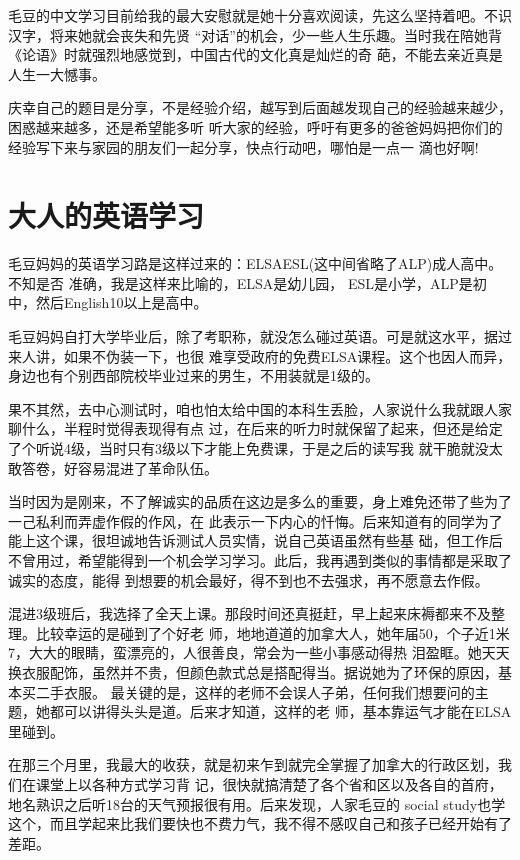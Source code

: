 \documentclass[11pt,a4paper,onecolumn]{article}
\begin{document}
毛豆的中文学习目前给我的最大安慰就是她十分喜欢阅读，先这么坚持着吧。不识汉字，将来她就会丧失和先贤
``对话''的机会，少一些人生乐趣。当时我在陪她背《论语》时就强烈地感觉到，中国古代的文化真是灿烂的奇
葩，不能去亲近真是人生一大憾事。


庆幸自己的题目是分享，不是经验介绍，越写到后面越发现自己的经验越来越少，困惑越来越多，还是希望能多听
听大家的经验，呼吁有更多的爸爸妈妈把你们的经验写下来与家园的朋友们一起分享，快点行动吧，哪怕是一点一
滴也好啊!

\section{大人的英语学习}

毛豆妈妈的英语学习路是这样过来的：ELSA\myrule ESL\myrule (这中间省略了ALP)\myrule 成人高中。不知是否
准确，我是这样来比喻的，ELSA是幼儿园， ESL是小学，ALP是初中，然后English10以上是高中。

毛豆妈妈自打大学毕业后，除了考职称，就没怎么碰过英语。可是就这水平，据过来人讲，如果不伪装一下，也很
难享受政府的免费ELSA课程。这个也因人而异，身边也有个别西部院校毕业过来的男生，不用装就是1级的。


果不其然，去中心测试时，咱也怕太给中国的本科生丢脸，人家说什么我就跟人家聊什么，半程时觉得表现得有点
过，在后来的听力时就保留了起来，但还是给定了个听说4级，当时只有3级以下才能上免费课，于是之后的读写我
就干脆就没太敢答卷，好容易混进了革命队伍。


当时因为是刚来，不了解诚实的品质在这边是多么的重要，身上难免还带了些为了一己私利而弄虚作假的作风，在
此表示一下内心的忏悔。后来知道有的同学为了能上这个课，很坦诚地告诉测试人员实情，说自己英语虽然有些基
础，但工作后不曾用过，希望能得到一个机会学习学习。此后，我再遇到类似的事情都是采取了诚实的态度，能得
到想要的机会最好，得不到也不去强求，再不愿意去作假。


混进3级班后，我选择了全天上课。那段时间还真挺赶，早上起来床褥都来不及整理。比较幸运的是碰到了个好老
师，地地道道的加拿大人，她年届50，个子近1米7，大大的眼睛，蛮漂亮的，人很善良，常会为一些小事感动得热
泪盈眶。她天天换衣服配饰，虽然并不贵，但颜色款式总是搭配得当。据说她为了环保的原因，基本买二手衣服。
最关键的是，这样的老师不会误人子弟，任何我们想要问的主题，她都可以讲得头头是道。后来才知道，这样的老
师，基本靠运气才能在ELSA里碰到。


在那三个月里，我最大的收获，就是初来乍到就完全掌握了加拿大的行政区划，我们在课堂上以各种方式学习背
记，很快就搞清楚了各个省和区以及各自的首府，地名熟识之后听18台的天气预报很有用。后来发现，人家毛豆的
social study也学这个，而且学起来比我们要快也不费力气，我不得不感叹自己和孩子已经开始有了差距。
\end{document}
